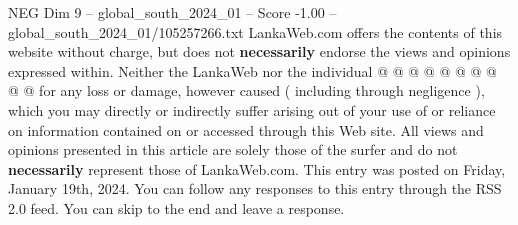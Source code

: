 \begin{textsample}{NEG Dim 9 – global\_south\_2024\_01 – Score -1.00 – global\_south\_2024\_01/105257266.txt}
LankaWeb.com offers the contents of this website without charge, but does not \textbf{necessarily} endorse the views and opinions expressed within.
Neither the LankaWeb nor the individual @ @ @ @ @ @ @ @ @ @ for any loss or damage, however caused ( including through negligence ), which you may directly or indirectly suffer arising out of your use of or reliance on information contained on or accessed through this Web site.
All views and opinions presented in this article are solely those of the surfer and do not \textbf{necessarily} represent those of LankaWeb.com.
This entry was posted on Friday, January 19th, 2024.
You can follow any responses to this entry through the RSS 2.0 feed.
You can skip to the end and leave a response.

\end{textsample}
